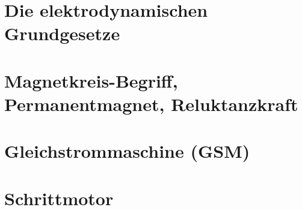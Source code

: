 \documentclass[10pt,twoside,a4paper,fleqn]{article}
\begin{document}
\setcounter{tocdepth}{2} 	%
\tableofcontents 				%
\newpage
\section{Die elektrodynamischen Grundgesetze}

\section{Magnetkreis-Begriff, Permanentmagnet, Reluktanzkraft}

\section{Gleichstrommaschine (GSM)}

\section{Schrittmotor}

\end{document}
